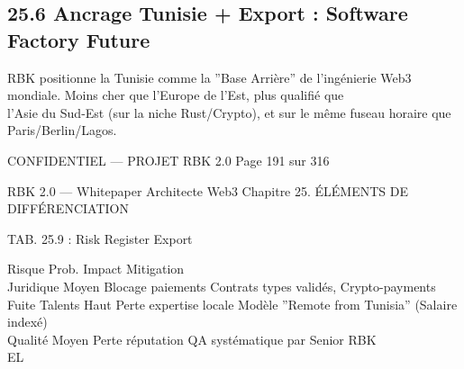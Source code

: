 \subsection{25.6 Ancrage Tunisie + Export : Software Factory Future}
RBK positionne la Tunisie comme la ”Base Arrière” de l’ingénierie Web3 mondiale. Moins cher que l’Europe de l’Est, plus qualifié que\\
l’Asie du Sud-Est (sur la niche Rust/Crypto), et sur le même fuseau horaire que Paris/Berlin/Lagos.\\
\vspace{0.5em}
\vspace{0.5em}
\vspace{0.5em}
\vspace{0.5em}
\begin{confidential}CONFIDENTIEL — PROJET RBK 2.0                               Page 191 sur 316\end{confidential}
RBK 2.0 — Whitepaper Architecte Web3                                                              Chapitre 25. ÉLÉMENTS DE DIFFÉRENCIATION\\
\vspace{0.5em}
\vspace{0.5em}
\begin{center}\begin{tabular}TAB. 25.9 : Risk Register Export\end{tabular}\end{center}
\vspace{0.5em}
\vspace{0.5em}
Risque          Prob.   Impact               Mitigation\\
\vspace{0.5em}
Juridique       Moyen Blocage paiements      Contrats types validés, Crypto-payments\\
\vspace{0.5em}
Fuite Talents Haut      Perte expertise locale Modèle ”Remote from Tunisia” (Salaire indexé)\\
\vspace{0.5em}
Qualité         Moyen Perte réputation       QA systématique par Senior RBK\\
\vspace{0.5em}
\vspace{0.5em}
\vspace{0.5em}
\vspace{0.5em}
EL\\

